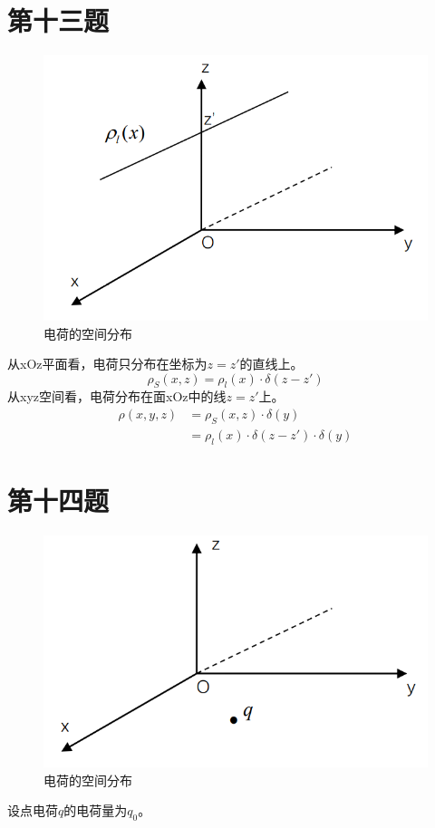 \documentclass[a4paper]{article}
\begin{document}
	\section{第十三题}
		\begin{figure}[htbp]
			\centering
			\includegraphics[scale=0.6]{13.png}
			\caption{电荷的空间分布}
		\end{figure}
		从xOz平面看，电荷只分布在坐标为$z=z'$的直线上。
		\begin{equation}
			\rho_S(x,z) = \rho_l(x) \cdot \delta(z-z')
		\end{equation}
		从xyz空间看，电荷分布在面xOz中的线$z=z'$上。
		\begin{equation}
			\begin{split}
				\rho(x,y,z) &= \rho_S(x,z) \cdot \delta(y)\\
				&= \rho_l(x) \cdot \delta(z-z') \cdot \delta(y)
			\end{split}
		\end{equation}
	\section{第十四题}
		\begin{figure}[htbp]
			\centering
			\includegraphics[scale=0.6]{14.png}
			\caption{电荷的空间分布}			
		\end{figure}
		设点电荷$q$的电荷量为$q_0$。
\end{document}
